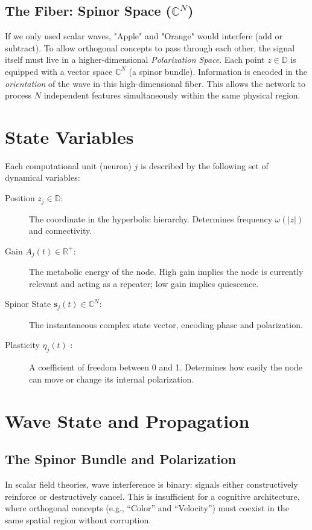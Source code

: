 \documentclass{article}
\begin{document}
\subsection{The Fiber: Spinor Space ($\mathbb{C}^N$)}
If we only used scalar waves, "Apple" and "Orange" would interfere (add or subtract). To allow orthogonal concepts to pass through each other, the signal itself must live in a higher-dimensional \textit{Polarization Space}.
Each point $z \in \mathbb{D}$ is equipped with a vector space $\mathbb{C}^N$ (a spinor bundle). Information is encoded in the \textit{orientation} of the wave in this high-dimensional fiber. This allows the network to process $N$ independent features simultaneously within the same physical region.

\section{State Variables}
Each computational unit (neuron) $j$ is described by the following set of dynamical variables:

\begin{description}
    \item[Position $z_j \in \mathbb{D}$:] The coordinate in the hyperbolic hierarchy. Determines frequency $\omega(|z|)$ and connectivity.
    \item[Gain $A_j(t) \in \mathbb{R}^+$:] The metabolic energy of the node. High gain implies the node is currently relevant and acting as a repeater; low gain implies quiescence.
    \item[Spinor State $\mathbf{s}_j(t) \in \mathbb{C}^N$:] The instantaneous complex state vector, encoding phase and polarization.
    \item[Plasticity $\eta_j(t)$ :] A coefficient of freedom between 0 and 1. Determines how easily the node can move or change its internal polarization.
\end{description}

\section{Wave State and Propagation}

\subsection{The Spinor Bundle and Polarization}
In scalar field theories, wave interference is binary: signals either constructively reinforce or destructively cancel. This is insufficient for a cognitive architecture, where orthogonal concepts (e.g., ``Color'' and ``Velocity'') must coexist in the same spatial region without corruption.
\end{document}
